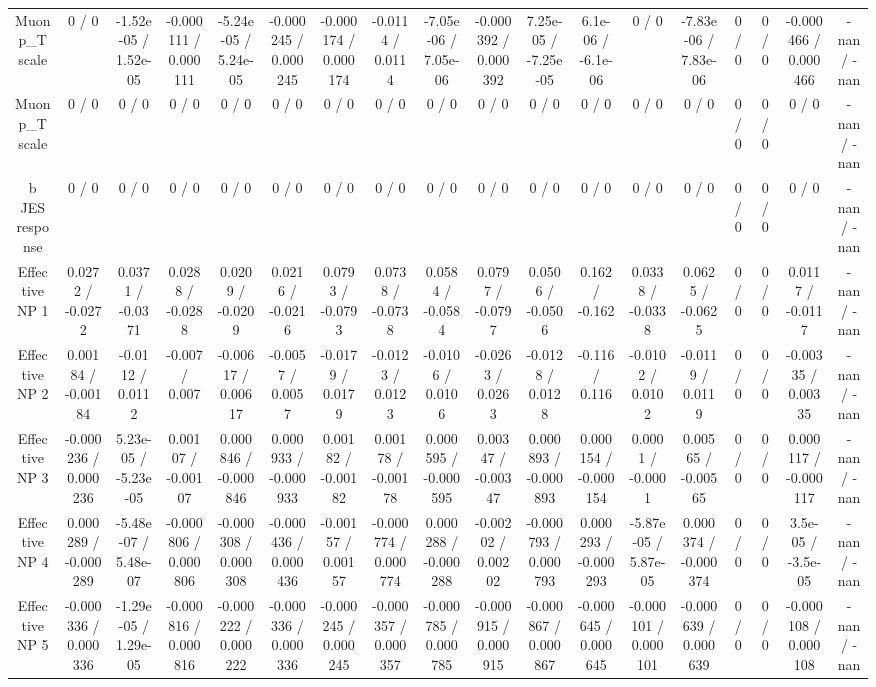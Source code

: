 \documentclass[10pt]{article}
\begin{document}
\begin{table}[htbp]
\begin{center}
\begin{tabular}{|c|c|c|c|c|c|c|c|c|c|c|c|c|c|c|c|c|c|}
  Muon p_{T} scale & 0 / 0 & -1.52e-05 / 1.52e-05 & -0.000111 / 0.000111 & -5.24e-05 / 5.24e-05 & -0.000245 / 0.000245 & -0.000174 / 0.000174 & -0.0114 / 0.0114 & -7.05e-06 / 7.05e-06 & -0.000392 / 0.000392 & 7.25e-05 / -7.25e-05 & 6.1e-06 / -6.1e-06 & 0 / 0 & -7.83e-06 / 7.83e-06 & 0 / 0 & 0 / 0 & -0.000466 / 0.000466 & -nan / -nan \\ 
  Muon p_{T} scale & 0 / 0 & 0 / 0 & 0 / 0 & 0 / 0 & 0 / 0 & 0 / 0 & 0 / 0 & 0 / 0 & 0 / 0 & 0 / 0 & 0 / 0 & 0 / 0 & 0 / 0 & 0 / 0 & 0 / 0 & 0 / 0 & -nan / -nan \\ 
  b JES response & 0 / 0 & 0 / 0 & 0 / 0 & 0 / 0 & 0 / 0 & 0 / 0 & 0 / 0 & 0 / 0 & 0 / 0 & 0 / 0 & 0 / 0 & 0 / 0 & 0 / 0 & 0 / 0 & 0 / 0 & 0 / 0 & -nan / -nan \\ 
  Effective NP 1 & 0.0272 / -0.0272 & 0.0371 / -0.0371 & 0.0288 / -0.0288 & 0.0209 / -0.0209 & 0.0216 / -0.0216 & 0.0793 / -0.0793 & 0.0738 / -0.0738 & 0.0584 / -0.0584 & 0.0797 / -0.0797 & 0.0506 / -0.0506 & 0.162 / -0.162 & 0.0338 / -0.0338 & 0.0625 / -0.0625 & 0 / 0 & 0 / 0 & 0.0117 / -0.0117 & -nan / -nan \\ 
  Effective NP 2 & 0.00184 / -0.00184 & -0.0112 / 0.0112 & -0.007 / 0.007 & -0.00617 / 0.00617 & -0.0057 / 0.0057 & -0.0179 / 0.0179 & -0.0123 / 0.0123 & -0.0106 / 0.0106 & -0.0263 / 0.0263 & -0.0128 / 0.0128 & -0.116 / 0.116 & -0.0102 / 0.0102 & -0.0119 / 0.0119 & 0 / 0 & 0 / 0 & -0.00335 / 0.00335 & -nan / -nan \\ 
  Effective NP 3 & -0.000236 / 0.000236 & 5.23e-05 / -5.23e-05 & 0.00107 / -0.00107 & 0.000846 / -0.000846 & 0.000933 / -0.000933 & 0.00182 / -0.00182 & 0.00178 / -0.00178 & 0.000595 / -0.000595 & 0.00347 / -0.00347 & 0.000893 / -0.000893 & 0.000154 / -0.000154 & 0.0001 / -0.0001 & 0.00565 / -0.00565 & 0 / 0 & 0 / 0 & 0.000117 / -0.000117 & -nan / -nan \\ 
  Effective NP 4 & 0.000289 / -0.000289 & -5.48e-07 / 5.48e-07 & -0.000806 / 0.000806 & -0.000308 / 0.000308 & -0.000436 / 0.000436 & -0.00157 / 0.00157 & -0.000774 / 0.000774 & 0.000288 / -0.000288 & -0.00202 / 0.00202 & -0.000793 / 0.000793 & 0.000293 / -0.000293 & -5.87e-05 / 5.87e-05 & 0.000374 / -0.000374 & 0 / 0 & 0 / 0 & 3.5e-05 / -3.5e-05 & -nan / -nan \\ 
  Effective NP 5 & -0.000336 / 0.000336 & -1.29e-05 / 1.29e-05 & -0.000816 / 0.000816 & -0.000222 / 0.000222 & -0.000336 / 0.000336 & -0.000245 / 0.000245 & -0.000357 / 0.000357 & -0.000785 / 0.000785 & -0.000915 / 0.000915 & -0.000867 / 0.000867 & -0.000645 / 0.000645 & -0.000101 / 0.000101 & -0.000639 / 0.000639 & 0 / 0 & 0 / 0 & -0.000108 / 0.000108 & -nan / -nan \\ 

\end{tabular}
\end{center}
\end{table}
\end{document}
